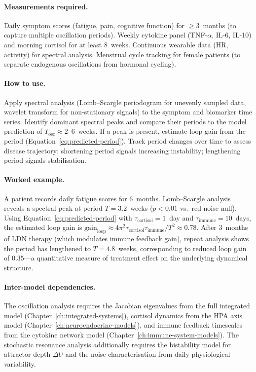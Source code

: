\paragraph{Measurements required.}
Daily symptom scores (fatigue, pain, cognitive function) for $\geq 3$~months (to capture multiple oscillation periods). Weekly cytokine panel (TNF-$\alpha$, IL-6, IL-10) and morning cortisol for at least 8~weeks. Continuous wearable data (HR, activity) for spectral analysis. Menstrual cycle tracking for female patients (to separate endogenous oscillations from hormonal cycling).

\paragraph{How to use.}
Apply spectral analysis (Lomb--Scargle periodogram for unevenly sampled data, wavelet transform for non-stationary signals) to the symptom and biomarker time series. Identify dominant spectral peaks and compare their periods to the model prediction of $T_{\text{osc}} \approx 2$--$6$~weeks. If a peak is present, estimate loop gain from the period (Equation~\ref{eq:predicted-period}). Track period changes over time to assess disease trajectory: shortening period signals increasing instability; lengthening period signals stabilisation.

\paragraph{Worked example.}
A patient records daily fatigue scores for 6~months. Lomb--Scargle analysis reveals a spectral peak at period $T = 3.2$~weeks ($p < 0.01$ vs.\ red noise null). Using Equation~\ref{eq:predicted-period} with $\tau_{\text{cortisol}} = 1$~day and $\tau_{\text{immune}} = 10$~days, the estimated loop gain is $\text{gain}_{\text{loop}} \approx 4\pi^2 \tau_{\text{cortisol}} \tau_{\text{immune}} / T^2 \approx 0.78$. After 3~months of LDN therapy (which modulates immune feedback gain), repeat analysis shows the period has lengthened to $T = 4.8$~weeks, corresponding to reduced loop gain of $0.35$---a quantitative measure of treatment effect on the underlying dynamical structure.

\paragraph{Inter-model dependencies.}
The oscillation analysis requires the Jacobian eigenvalues from the full integrated model (Chapter~\ref{ch:integrated-systems}), cortisol dynamics from the HPA axis model (Chapter~\ref{ch:neuroendocrine-models}), and immune feedback timescales from the cytokine network model (Chapter~\ref{ch:immune-system-models}). The stochastic resonance analysis additionally requires the bistability model for attractor depth $\Delta U$ and the noise characterisation from daily physiological variability.

